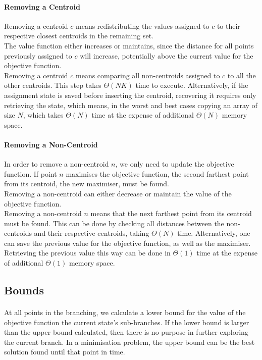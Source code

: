 \paragraph{Removing a Centroid}
Removing a centroid $c$ means redistributing the values assigned to $c$ to their respective closest centroids in the remaining set. \\
The value function either increases or maintains, since the distance for all points previously assigned to $c$ will increase, potentially above the current value for the objective function.\\
Removing a centroid $c$ means comparing all non-centroids assigned to $c$ to all the other centroids. This step takes $\Theta(NK)$ time to execute. Alternatively, if the assignment state is saved before inserting the centroid, recovering it requires only retrieving the state, which means, in the worst and best cases copying an array of size $N$, which takes $\Theta(N)$ time at the expense of additional $\Theta(N)$ memory space.

\paragraph{Removing a Non-Centroid}
In order to remove a non-centroid $n$, we only need to update the objective function. If point $n$ maximises the objective function, the second farthest point from its centroid, the new maximiser, must be found.\\
Removing a non-centroid can either decrease or maintain the value of the objective function.\\
Removing a non-centroid $n$ means that the next farthest point from its centroid must be found. This can be done by checking all distances between the non-centroids and their respective centroids, taking $\Theta(N)$ time. Alternatively, one can save the previous value for the objective function, as well as the maximiser. Retrieving the previous value this way can be done in $\Theta(1)$ time at the expense of additional $\Theta(1)$ memory space.
\subsection{Bounds}
\paragraph{}
At all points in the branching, we calculate a lower bound for the value of the objective function the current state's sub-branches. If the lower bound is larger than the upper bound calculated, then there is no purpose in further exploring the current branch. In a minimisation problem, the upper bound can be the best solution found until that point in time.

